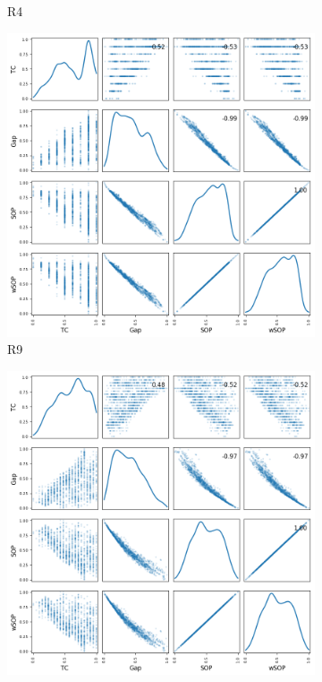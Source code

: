 \begin{figure}[!htbp]
\begin{adjustwidth}{-1cm}{-1cm}
\begin{subfigure}{0.35\textwidth}
		\caption{R4}
	\end{subfigure}
	\begin{subfigure}{0.35\textwidth}
		\includegraphics[width=\columnwidth]{Figure/NumGaps_SOP_TC_wSOP/precomputedInit/R9/fig/scatter_mattrix}
		\caption{R9}
	\end{subfigure}
	\begin{subfigure}{0.35\textwidth}
		\includegraphics[width=\columnwidth]{Figure/NumGaps_SOP_TC_wSOP/precomputedInit/R14/fig/scatter_mattrix}

\end{subfigure}
\end{adjustwidth}
\end{figure}
